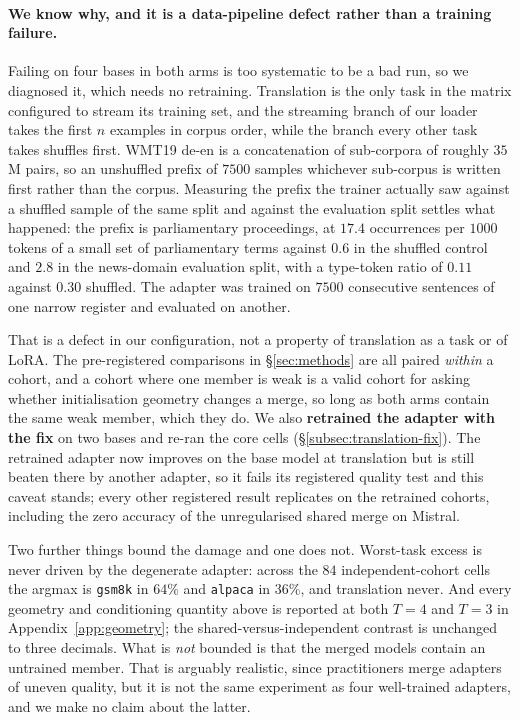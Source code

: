 \paragraph{We know why, and it is a data-pipeline defect rather than a
training failure.} Failing on four bases in both arms is too systematic to
be a bad run, so we diagnosed it, which needs no retraining. Translation is
the only task in the matrix configured to stream its training set, and the
streaming branch of our loader takes the first $n$ examples in corpus
order, while the branch every other task takes shuffles first. WMT19 de-en
is a concatenation of sub-corpora of roughly $35$M pairs, so an unshuffled
prefix of $7500$ samples whichever sub-corpus is written first rather than
the corpus. Measuring the prefix the trainer actually saw against a
shuffled sample of the same split and against the evaluation split settles
what happened: the prefix is parliamentary proceedings, at $17.4$
occurrences per $1000$ tokens of a small set of parliamentary terms against
$0.6$ in the shuffled control and $2.8$ in the news-domain evaluation
split, with a type-token ratio of $0.11$ against $0.30$ shuffled. The
adapter was trained on $7500$ consecutive sentences of one narrow register
and evaluated on another.

That is a defect in our configuration, not a property of translation as a
task or of LoRA. The pre-registered comparisons in \S\ref{sec:methods} are
all paired \emph{within} a cohort, and a cohort where one member is weak is a
valid cohort for asking whether initialisation geometry changes a merge, so
long as both arms contain the same weak member, which they do. We also
\textbf{retrained the adapter with the fix} on two bases and re-ran the core
cells (\S\ref{subsec:translation-fix}). The retrained adapter now improves on
the base model at translation but is still beaten there by another adapter, so
it fails its registered quality test and this caveat stands; every other
registered result replicates on the retrained cohorts, including the zero
accuracy of the unregularised shared merge on Mistral.

Two further things bound the damage and one does not. Worst-task excess is never
driven by the degenerate adapter: across the $84$ independent-cohort cells the
argmax is \texttt{gsm8k} in $64\%$ and \texttt{alpaca} in $36\%$, and
translation never. And every geometry and conditioning quantity above is
reported at both $T=4$ and $T=3$ in Appendix~\ref{app:geometry}; the
shared-versus-independent contrast is unchanged to three decimals. What is
\emph{not} bounded is that the merged models contain an untrained member. That
is arguably realistic, since practitioners merge adapters of uneven quality,
but it is not the same experiment as four well-trained adapters, and we make
no claim about the latter.

